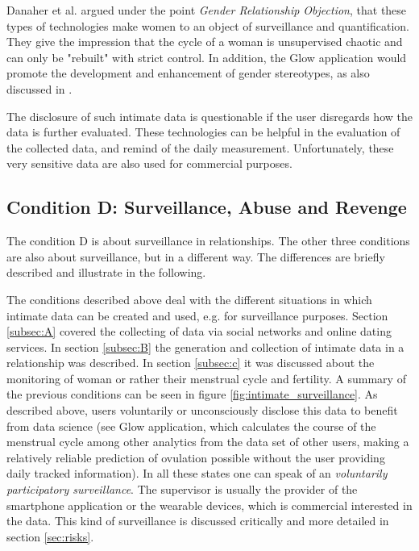 Danaher et al. \cite{doi:10.1080/15265161.2017.1409823} argued under the point \textit{Gender Relationship Objection}, that these types of technologies make women to an object of surveillance and quantification.
They give the impression that the cycle of a woman is unsupervised chaotic and can only be "rebuilt" with strict control.
In addition, the Glow application would promote the development and enhancement of gender stereotypes, as also discussed in \cite{doi:10.1080/13691058.2014.920528}.
 
The disclosure of such intimate data is questionable if the user disregards how the data is further evaluated. These technologies can be helpful in the evaluation of the collected data, and remind of the daily measurement. Unfortunately, these very sensitive data are also used for commercial purposes.

\subsection{Condition D: Surveillance, Abuse and Revenge}
\label{subsec:D}
The condition D is about surveillance in relationships. The other three conditions are also about surveillance, but in a different way. The differences are briefly described and illustrate in the following.
 
The conditions described above deal with the different situations in which intimate data can be created and used, e.g. for surveillance purposes.
Section \ref{subsec:A} covered the collecting of data via social networks and online dating services. In section \ref{subsec:B} the generation and collection of intimate data in a relationship was described. In section \ref{subsec:c} it was discussed about the monitoring of woman or rather their menstrual cycle and fertility.
A summary of the previous conditions can be seen in figure \ref{fig:intimate_surveillance}.
As described above, users voluntarily or unconsciously disclose this data to benefit from data science (see Glow application, which calculates the course of the menstrual cycle among other analytics from the data set of other users, making a relatively reliable prediction of ovulation possible without the user providing daily tracked information).
In all these states one can speak of an \textit{voluntarily participatory surveillance}.
The supervisor is usually the provider of the smartphone application or the wearable devices, which is commercial interested in the data. This kind of surveillance is discussed critically and more detailed in section \ref{sec:risks}.

